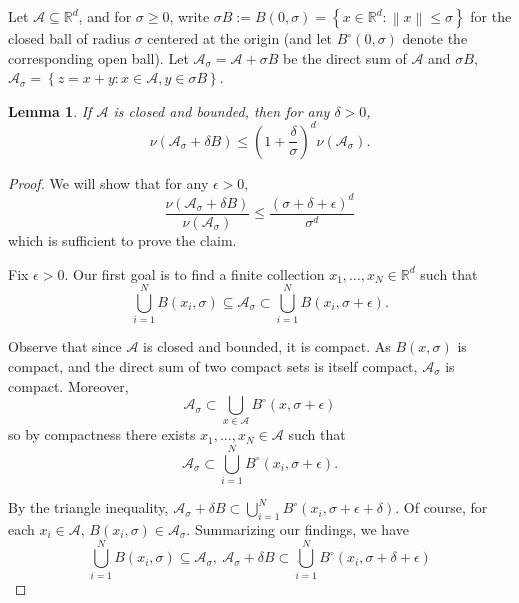 \documentclass{article}
\newcommand{\set}[1]{\left\{#1\right\}}
\newcommand{\Reals}{\mathbb{R}}
\newcommand{\Rd}{\Reals^d}
\newcommand{\norm}[1]{\left\lVert#1\right\rVert}
\newcommand{\1}{\mathbf{1}}
\newcommand{\Aset}{\mathcal{A}}
\newcommand{\Asig}{\Aset_{\sigma}}
\theoremstyle{aldenthm}
\newtheorem{lemma}{Lemma}
\begin{document}
Let $\Aset \subseteq \Reals^d$, and for $\sigma \geq 0$, write $\sigma B := B(0,\sigma) = \set{x \in \Rd: \norm{x} \leq \sigma}$ for the closed ball of radius $\sigma$ centered at the origin (and let $B^{\circ}(0,\sigma)$ denote the corresponding open ball). Let $\Asig = \Aset + \sigma B$ be the direct sum of $\Aset$ and $\sigma B$, $\Asig = \set{z = x + y: x \in \Aset, y \in \sigma B}$. 

\begin{lemma}
	\label{lem: expansion_volume}
	If $\Aset$ is closed and bounded, then for any $\delta > 0$,
	\begin{equation*}
	\nu(\Asig + \delta B) \leq \left(1 + \frac{\delta}{\sigma}\right)^d \nu(\Asig).
	\end{equation*}
\end{lemma}
\begin{proof}
	We will show that for any $\epsilon > 0$, 
	\begin{equation}
	\label{eqn: ratio_of_volume}
	\frac{\nu(\Asig + \delta B)}{\nu(\Asig)} \leq \frac{(\sigma + \delta + \epsilon)^d}{\sigma^d}
	\end{equation}
	which is sufficient to prove the claim.
	
	
	Fix $\epsilon > 0$. Our first goal is to find a finite collection $x_1, \ldots, x_N \in \Rd$ such that
	\begin{equation*}
	\bigcup_{i = 1}^{N} B(x_i, \sigma) \subseteq \Asig \subset \bigcup_{i = 1}^{N} B(x_i, \sigma + \epsilon). \tag{$N := N(\epsilon)$}
	\end{equation*}
	
	Observe that since $\Aset$ is closed and bounded, it is compact. As $B(x,\sigma)$ is compact, and the direct sum of two compact sets is itself compact, $\Asig$ is compact. Moreover,
	\begin{equation*}
	\Asig \subset \bigcup_{x \in \Aset} B^{\circ}(x,\sigma + \epsilon)
	\end{equation*}
	so by compactness there exists $x_1, \ldots,x_N \in \Aset$ such that
	\begin{equation*}
	\Asig \subset \bigcup_{i = 1}^{N} B^{\circ}(x_i,\sigma + \epsilon).
	\end{equation*}
	
	By the triangle inequality, $\Asig + \delta B \subset \bigcup_{i = 1}^{N} B^{\circ}(x_i,\sigma + \epsilon + \delta)$. Of course, for each $x_i \in \Aset$, $B(x_i,\sigma) \in \Asig$. Summarizing our findings, we have
	\begin{equation}
	\label{eqn: finite_subcover}
	\bigcup_{i = 1}^{N} B(x_i,\sigma) \subseteq \Asig  ,~\Asig + \delta B \subset \bigcup_{i = 1}^{N} B^{\circ}(x_i,\sigma + \delta + \epsilon)
	\end{equation}
	

\end{proof}
\end{document}
